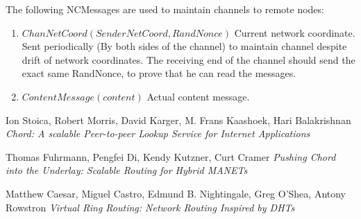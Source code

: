 \documentclass{amsart}
\theoremstyle{definition}
\theoremstyle{remark}
\numberwithin{equation}{section}
\begin{document}
The following NCMessages are used to maintain channels to remote nodes:

\begin{enumerate}
  \item $ChanNetCoord(SenderNetCoord, RandNonce)$ Current network coordinate. Sent
    periodically (By both sides of the channel) to maintain channel despite
    drift of network coordinates. The receiving end of the channel should send
    the exact same RandNonce, to prove that he can read the messages.

  \item $ContentMessage(content)$
    Actual content message.

\end{enumerate}










\begin{thebibliography}{9}
Ion Stoica, Robert Morris, David Karger, M. Frans Kaashoek, Hari Balakrishnan
\textit{Chord: A scalable Peer-to-peer Lookup Service for Internet Applications}

Thomas Fuhrmann, Pengfei Di, Kendy Kutzner, Curt Cramer
\textit{Pushing Chord into the Underlay: Scalable Routing for Hybrid MANETs}

  Matthew Caesar, Miguel Castro, Edmund B. Nightingale, Greg O'Shea, Antony Rowstron
\textit{Virtual Ring Routing: Network Routing Inspired by DHTs}
\\

\end{thebibliography}
\end{document}
